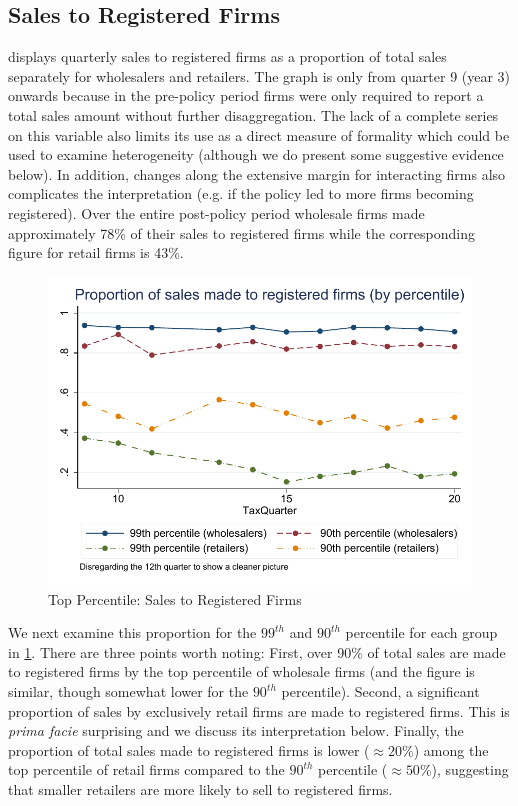 \subsection{Sales to Registered Firms}
\label{subsec:registered_sales}
 displays quarterly sales to registered firms as a proportion of total sales separately for wholesalers and retailers. The graph is only from quarter 9 (year 3) onwards because in the pre-policy period firms were only required to report a total sales amount without further disaggregation. The lack of a complete series on this variable also limits its use as a direct measure of formality which could be used to examine heterogeneity (although we do present some suggestive evidence below). In addition, changes along the extensive margin for interacting firms also complicates the interpretation (e.g. if the policy led to more firms becoming registered). Over the entire post-policy period wholesale firms made approximately 78\% of their sales to registered firms while the corresponding figure for retail firms is 43\%.

\begin{figure}[t!] 
\includegraphics{graphs/ProportionSalesRegisteredTopPercentile_v2_without12.pdf}
\caption{Top Percentile: Sales to Registered Firms}
\label{fig:sales_registered_percentile}
\end{figure}

We next examine this proportion for the $99^{th}$ and $90^{th}$ percentile for each group in \cref{fig:sales_registered_percentile}. There are three points worth noting: First, over 90\% of total sales are made to registered firms by the top percentile of wholesale firms (and the figure is similar, though somewhat lower for the $90^{th}$ percentile). Second, a significant proportion of sales by exclusively retail firms are made to registered firms. This is \emph{prima facie} surprising and we discuss its interpretation below. Finally, the proportion of total sales made to registered firms is lower ($\approx 20\%$) among the top percentile of retail firms compared to the $90^{th}$ percentile ($\approx 50\%$), suggesting that smaller retailers are more likely to sell to registered firms.


